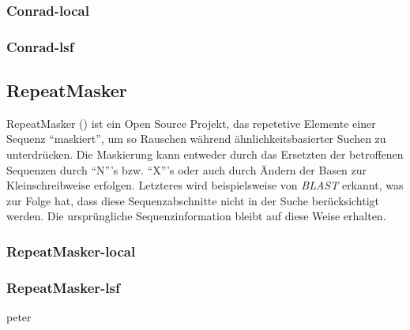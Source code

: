 \subsubsection{Conrad-local}
\subsubsection{Conrad-lsf}
\subsection{RepeatMasker}
RepeatMasker
()
ist ein Open Source Projekt, das repetetive Elemente einer Sequenz
\enquote{maskiert}, um so Rauschen während ähnlichkeitsbasierter Suchen zu
unterdrücken.
Die Maskierung kann entweder durch das Ersetzten der betroffenen Sequenzen
durch \enquote{N}'s bzw. \enquote{X}'s oder auch durch Ändern der Basen zur
Kleinschreibweise erfolgen.
Letzteres wird beispielsweise von \textit{BLAST} erkannt, was zur Folge hat,
dass diese Sequenzabschnitte nicht in der Suche berücksichtigt werden.
Die ursprüngliche Sequenzinformation bleibt auf diese Weise	erhalten.
\subsubsection{RepeatMasker-local}
\subsubsection{RepeatMasker-lsf}
peter
